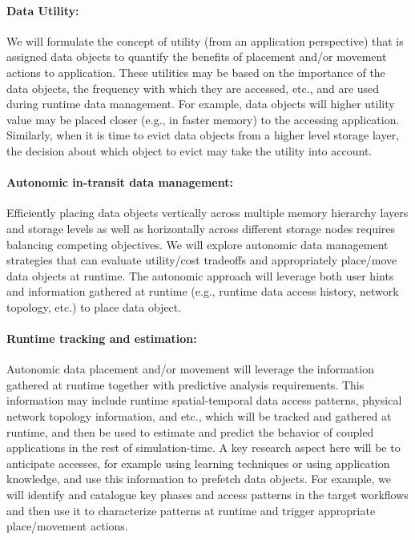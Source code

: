 \paragraph{Data Utility:} We will formulate the concept of utility (from an
application perspective) that is assigned data objects to quantify the
benefits of placement and/or movement actions to application. These
utilities may be based on the importance of the data objects, the frequency
with which they are accessed, etc., and are used during runtime data
management. For example, data objects will higher utility value may be
placed closer (e.g., in faster memory) to the accessing application.
Similarly, when it is time to evict data objects from a higher level storage
layer, the decision about which object to evict may take the utility into
account.

\paragraph{Autonomic in-transit data management:} 
Efficiently placing data objects
vertically across multiple memory hierarchy layers and storage levels as
well as horizontally across different storage nodes requires balancing
competing objectives. We will explore autonomic data
management strategies that can evaluate utility/cost tradeoffs and
appropriately place/move data objects at runtime. The autonomic approach
will leverage both user hints and information gathered at runtime (e.g.,
runtime data access history, network topology, etc.) to place data object.

\paragraph{ Runtime tracking and estimation:}
Autonomic data placement and/or
movement will leverage the information gathered at runtime together with
predictive analysis requirements. This information may include runtime
spatial-temporal data access patterns, physical network topology
information, and etc., which will be tracked and gathered at runtime, and
then be used to estimate and predict the behavior of coupled applications in
the rest of simulation-time. A key research aspect here will be to
anticipate accesses, for example using learning techniques or using
application knowledge, and use this information to prefetch data objects.
For example, we will identify and catalogue key phases and access patterns
in the target workflows and then use it to characterize patterns at runtime
and trigger appropriate place/movement actions.

